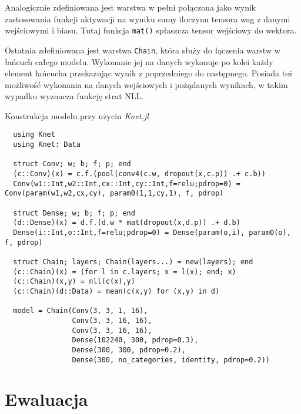 \documentclass[pl,12pt]{aghdpl}
\let\Oldchapter\chapter%
\renewcommand{\chapter}{\FloatBarrier\Oldchapter}
\begin{document}
Analogicznie zdefiniowana jest warstwa w pełni połączona jako wynik
zastosowania funkcji aktywacji na wyniku sumy iloczynu tensora wag z danymi
wejściowymi i biasu. Tutaj funkcja \lstinline|mat()| spłaszcza tensor wejściowy
do wektora.

Ostatnia zdefiniowana jest warstwa \lstinline|Chain|, która służy do łączenia
warstw w łańcuch całego modelu. Wykonanie jej na danych wykonuje po kolei każdy
element łańcucha przekazując wynik z poprzedniego do następnego. Posiada też
możliwość wykonania na danych wejściowych i pożądanych wynikach, w takim
wypadku wyznacza funkcję strat NLL.

\begin{program}
  \caption{Konstrukcja modelu przy użyciu \textit{Knet.jl}}
  \label{lst:Knet_model}
  \begin{lstlisting}
  using Knet
  using Knet: Data

  struct Conv; w; b; f; p; end
  (c::Conv)(x) = c.f.(pool(conv4(c.w, dropout(x,c.p)) .+ c.b))
  Conv(w1::Int,w2::Int,cx::Int,cy::Int,f=relu;pdrop=0) = Conv(param(w1,w2,cx,cy), param0(1,1,cy,1), f, pdrop)

  struct Dense; w; b; f; p; end
  (d::Dense)(x) = d.f.(d.w * mat(dropout(x,d.p)) .+ d.b)
  Dense(i::Int,o::Int,f=relu;pdrop=0) = Dense(param(o,i), param0(o), f, pdrop)

  struct Chain; layers; Chain(layers...) = new(layers); end
  (c::Chain)(x) = (for l in c.layers; x = l(x); end; x)
  (c::Chain)(x,y) = nll(c(x),y)
  (c::Chain)(d::Data) = mean(c(x,y) for (x,y) in d)

  model = Chain(Conv(3, 3, 1, 16),
                Conv(3, 3, 16, 16),
                Conv(3, 3, 16, 16),
                Dense(102240, 300, pdrop=0.3),
                Dense(300, 300, pdrop=0.2),
                Dense(300, no_categories, identity, pdrop=0.2))
  \end{lstlisting}
\end{program}
\chapter{Ewaluacja}
\end{document}
